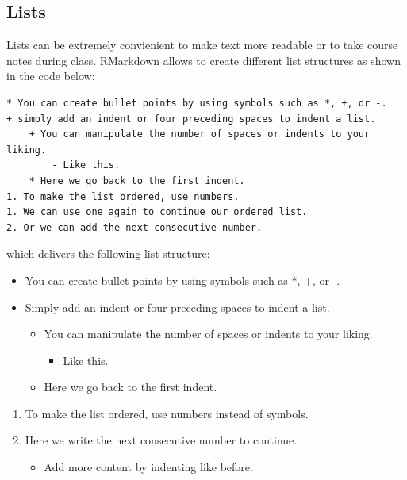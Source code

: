 \documentclass[]{book}
\providecommand{\tightlist}{%
  \setlength{\itemsep}{0pt}\setlength{\parskip}{0pt}}
\theoremstyle{definition}
\theoremstyle{definition}
\theoremstyle{remark}
\begin{document}
\subsection{Lists}\label{lists}

Lists can be extremely convienient to make text more readable or to take
course notes during class. RMarkdown allows to create different list
structures as shown in the code below:

\begin{verbatim}
* You can create bullet points by using symbols such as *, +, or -. 
+ simply add an indent or four preceding spaces to indent a list. 
    + You can manipulate the number of spaces or indents to your liking. 
        - Like this. 
    * Here we go back to the first indent. 
1. To make the list ordered, use numbers. 
1. We can use one again to continue our ordered list. 
2. Or we can add the next consecutive number. 
\end{verbatim}

which delivers the following list structure:

\begin{itemize}
\tightlist
\item
  You can create bullet points by using symbols such as *, +, or -.
\item
  Simply add an indent or four preceding spaces to indent a list.

  \begin{itemize}
  \tightlist
  \item
    You can manipulate the number of spaces or indents to your liking.

    \begin{itemize}
    \tightlist
    \item
      Like this.
    \end{itemize}
  \item
    Here we go back to the first indent.
  \end{itemize}
\end{itemize}

\begin{enumerate}
\def\labelenumi{\arabic{enumi}.}
\tightlist
\item
  To make the list ordered, use numbers instead of symbols.
\item
  Here we write the next consecutive number to continue.

  \begin{itemize}
  \tightlist
  \item
    Add more content by indenting like before.
  \end{itemize}
\end{enumerate}
\end{document}
